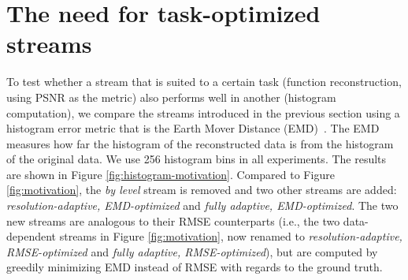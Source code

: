 \section{The need for task-optimized streams}
To test whether a stream that is suited to a certain task (function reconstruction, using PSNR as
the metric) also performs well in another (histogram computation), we compare the streams introduced
in the previous section using a histogram error metric that is the Earth Mover Distance (EMD)~\cite{emd1998}.
The EMD measures how far the histogram of the reconstructed data is from the histogram of
the original data. We use 256 histogram bins in all experiments. The results are shown in Figure
\ref{fig:histogram-motivation}. Compared to Figure \ref{fig:motivation}, the \emph{by level} stream
is removed and two other streams are added: \emph{resolution-adaptive, EMD-optimized} and
\emph{fully adaptive, EMD-optimized}. The two new streams are analogous to their RMSE counterparts
(i.e., the two data-dependent streams in Figure \ref{fig:motivation}, now renamed to
\emph{resolution-adaptive, RMSE-optimized} and \emph{fully adaptive, RMSE-optimized}), but are
computed by greedily minimizing EMD instead of RMSE with regards to the ground truth.

